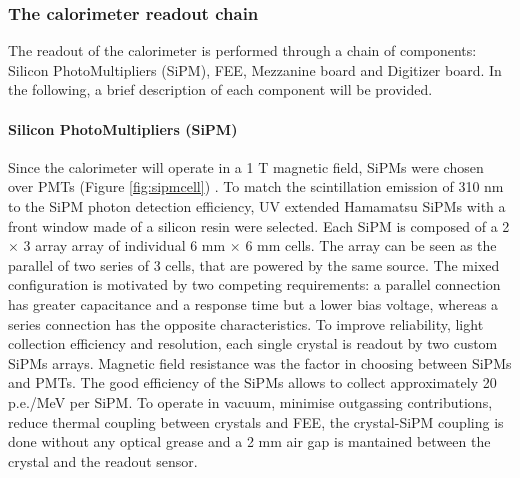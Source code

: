 \subsubsection{The calorimeter readout chain}
The readout of the calorimeter is performed through a chain of components: Silicon PhotoMultipliers (SiPM), 
FEE, Mezzanine board and Digitizer board. In the following, 
a brief description of each component will be provided.
\paragraph{Silicon PhotoMultipliers (SiPM)}
Since the calorimeter will operate in a 1 T magnetic field, SiPMs were chosen over PMTs (Figure \ref{fig:sipmcell}) \cite{em1}. 
To  match the scintillation emission of 310 nm to the SiPM photon detection efficiency, 
UV extended Hamamatsu SiPMs with a front window made of a silicon resin were selected. Each SiPM is composed of a
2 $\times$ 3 array array of individual 6 mm $\times$ 6 mm cells.
The array can be seen as the parallel of two series of 3 cells, that 
are powered by the same source. The mixed configuration is motivated by 
two competing requirements: a parallel connection has greater capacitance
and a  response time 
but  a lower bias voltage, whereas 
a series connection has the opposite characteristics. 
To improve reliability, light collection efficiency and resolution, each single 
crystal is readout by two custom SiPMs arrays.
Magnetic field resistance was the factor in choosing between SiPMs and PMTs.
The good efficiency of the SiPMs allows to collect approximately 20 p.e./MeV per SiPM.
To operate in vacuum, minimise outgassing contributions, reduce 
thermal coupling between crystals and FEE, the crystal-SiPM 
coupling is done without any optical grease and a 2 mm air gap is mantained 
between the crystal and the readout sensor.


